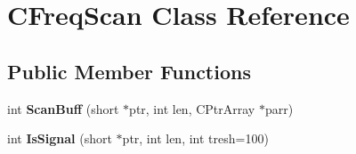 \hypertarget{class_c_freq_scan}{\section{C\-Freq\-Scan Class Reference}
\label{class_c_freq_scan}
}
\subsection*{Public Member Functions}
\begin{DoxyCompactItemize}
\item 
\hypertarget{class_c_freq_scan_a7a6179e9f13f1e331347c3a3121fbfa5}{int {\bfseries Scan\-Buff} (short $\ast$ptr, int len, C\-Ptr\-Array $\ast$parr)}\label{class_c_freq_scan_a7a6179e9f13f1e331347c3a3121fbfa5}

\item 
\hypertarget{class_c_freq_scan_a33e0b862d3575078d57aaad0af0b27b8}{int {\bfseries Is\-Signal} (short $\ast$ptr, int len, int tresh=100)}\label{class_c_freq_scan_a33e0b862d3575078d57aaad0af0b27b8}

\end{DoxyCompactItemize}
